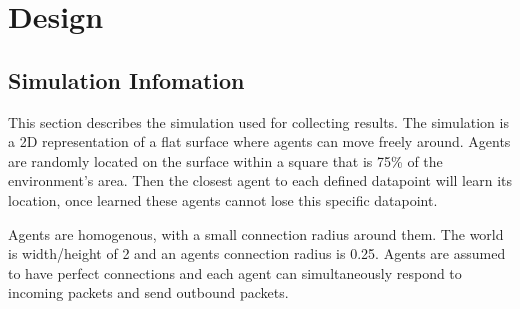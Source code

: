 \documentclass{UoYCSproject}
\begin{document}






\chapter{Design}
\label{cha:Design}


\section{Simulation Infomation}
\label{sec:Sim Info}

This section describes the simulation used for collecting results.
The simulation is a 2D representation of a flat surface where agents can move freely around.
Agents are randomly located on the surface within a square that is 75\% of the environment's area.
Then the closest agent to each defined datapoint will learn its location, once learned these agents cannot lose this specific datapoint.


Agents are homogenous, with a small connection radius around them.
The world is width/height of 2 and an agents connection radius is 0.25.
Agents are assumed to have perfect connections and each agent can simultaneously respond to incoming packets and send outbound packets.
\end{document}
